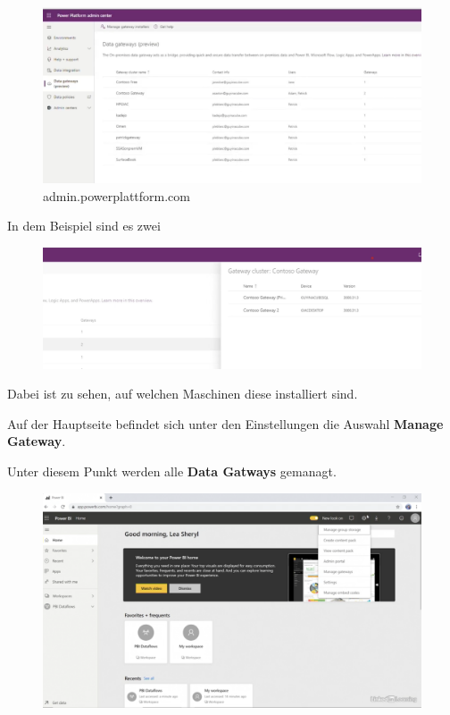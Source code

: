 \begin{figure}[H]
	\centering
	\includegraphics[scale = 0.3]{attachment/chapter_1/Scc131}
	\caption{admin.powerplattform.com}
\end{figure}

In dem Beispiel sind es zwei
\begin{figure}[H]
	\centering
	\includegraphics[scale = 0.3]{attachment/chapter_1/Scc133}
\end{figure}
Dabei ist zu sehen, auf welchen Maschinen diese installiert sind.


Auf der Hauptseite befindet sich unter den Einstellungen die Auswahl \textbf{Manage Gateway}. 

Unter diesem Punkt werden alle \textbf{Data Gatways} gemanagt.
\begin{figure}[H]
	\centering
	\includegraphics[scale = 0.3]{attachment/chapter_1/Scc121}
\end{figure} 

